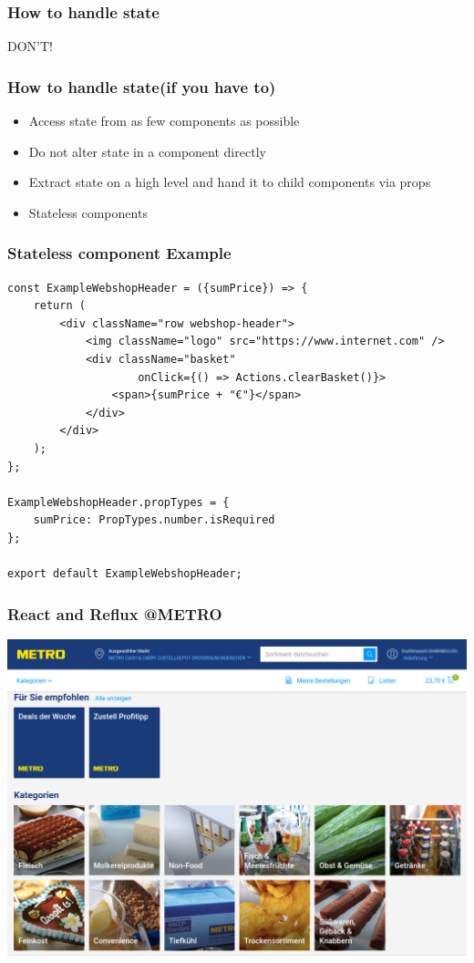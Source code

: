 \documentclass{beamer}
\begin{document}
\begin{frame}\frametitle{How to handle state}
\vspace*{\fill}
\begin{center}
\begin{minipage}{.6\textwidth}
DON'T!
\end{minipage}
\end{center}
\vfill %
\end{frame}

\begin{frame}\frametitle{How to handle state\newline(if you have to)}
\begin{itemize}
\item Access state from as few components as possible
\item Do not alter state in a component directly
\item Extract state on a high level and hand it to child components via props
\item Stateless components
\end{itemize}
\end{frame}

\begin{frame}[fragile]\frametitle{Stateless component \textendash{} Example}
\begin{lstlisting}[style=htmlcssjs]
const ExampleWebshopHeader = ({sumPrice}) => {
    return (
        <div className="row webshop-header">
            <img className="logo" src="https://www.internet.com" />
            <div className="basket" 
                    onClick={() => Actions.clearBasket()}>
                <span>{sumPrice + "€"}</span>
            </div>
        </div>
    );
};

ExampleWebshopHeader.propTypes = {
    sumPrice: PropTypes.number.isRequired
};

export default ExampleWebshopHeader;
\end{lstlisting}
\end{frame}

\begin{frame}\frametitle{React and Reflux @METRO}
\centering
\includegraphics[width=.85\linewidth,height=.85\textheight,keepaspectratio]{pics/betty.png}
\end{frame}
\end{document}
